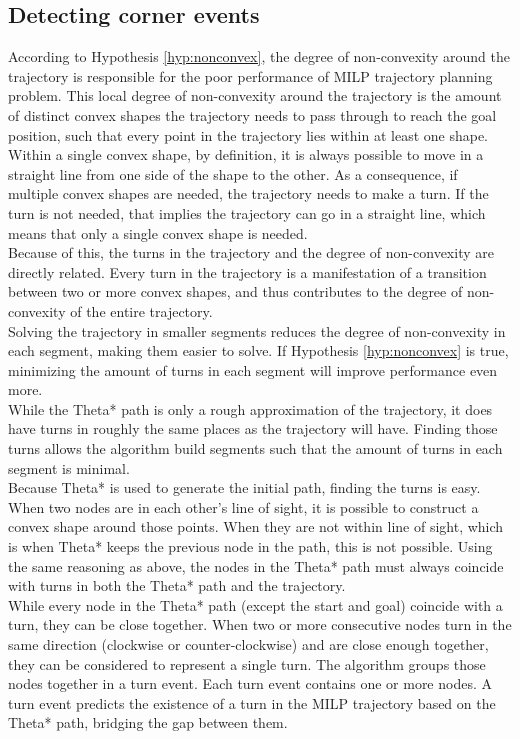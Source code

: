 \subsection{Detecting corner events}
According to Hypothesis \ref{hyp:nonconvex}, the degree of non-convexity around the trajectory is responsible for the poor performance of MILP trajectory planning problem. This local degree of non-convexity around the trajectory is the amount of distinct convex shapes the trajectory needs to pass through to reach the goal position, such that every point in the trajectory lies within at least one shape. \\
Within a single convex shape, by definition, it is always possible to move in a straight line from one side of the shape to the other. As a consequence, if multiple convex shapes are needed, the trajectory needs to make a turn. If the turn is not needed, that implies the trajectory can go in a straight line, which means that only a single convex shape is needed. \\
Because of this, the turns in the trajectory and the degree of non-convexity are  directly related. Every turn in the trajectory is a manifestation of a transition between two or more convex shapes, and thus contributes to the degree of non-convexity of the entire trajectory. \\
Solving the trajectory in smaller segments reduces the degree of non-convexity in each segment, making them easier to solve. If Hypothesis \ref{hyp:nonconvex} is true, minimizing the amount of turns in each segment will improve performance even more. \\
While the Theta* path is only a rough approximation of the trajectory, it does have turns in roughly the same places as the trajectory will have. Finding those turns allows the algorithm build segments such that the amount of turns in each segment is minimal. \\
Because Theta* is used to generate the initial path, finding the turns is easy. When two nodes are in each other's line of sight, it is possible to construct a convex shape around those points. When they are not within line of sight, which is when Theta* keeps the previous node in the path, this is not possible. Using the same reasoning as above, the nodes in the Theta* path must always coincide with turns in both the Theta* path and the trajectory. \\
While every node in the Theta* path (except the start and goal) coincide with a turn, they can be close together. When two or more consecutive nodes turn in the same direction (clockwise or counter-clockwise) and are close enough together, they can be considered to represent a single turn. The algorithm groups those nodes together in a turn event. Each turn event contains one or more nodes. A turn event predicts the existence of a turn in the MILP trajectory based on the   Theta* path, bridging the gap between them.
